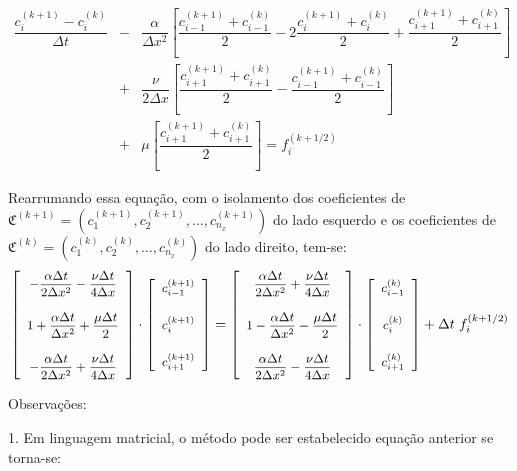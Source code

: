 \begin{eqnarray}
\dfrac{c_{i}^{(k+1)} - c_{i}^{(k)}}{\Delta t}
&-&
\dfrac{\alpha}{\Delta x^2}
\left[
\dfrac{c_{i-1}^{(k+1)}+c_{i-1}^{(k)}}{2}
-2
\dfrac{c_{i}^{(k+1)}+c_{i}^{(k)}}{2}
+
\dfrac{c_{i+1}^{(k+1)}+c_{i+1}^{(k)}}{2}
\right]
\nonumber \\
&+&
\dfrac{\nu}{2\Delta x}
\left[
\dfrac{c_{i+1}^{(k+1)}+c_{i+1}^{(k)}}{2}
-
\dfrac{c_{i-1}^{(k+1)}+c_{i-1}^{(k)}}{2}
\right]
\nonumber \\
&+&
\mu
\left[
\dfrac{c_{i+1}^{(k+1)}+c_{i+1}^{(k)}}{2}
\right]
= f_{i}^{(k+1/2)}
\label{eq:crank03}
\end{eqnarray}

Rearrumando essa equação, com o isolamento dos coeficientes de $\mathfrak{C}^{(k+1)} = \left(c_1^{(k+1)}, c_2^{(k+1)}, \ldots, c_{n_x}^{(k+1)}\right)$ do lado esquerdo e os coeficientes de $\mathfrak{C}^{(k)} = \left(c_1^{(k)}, c_2^{(k)}, \ldots, c_{n_x}^{(k)}\right)$ do lado direito, tem-se:
$$\small
\left[
\begin{array}{c}
- \dfrac{\alpha \Delta t}{2 \Delta x^2} - \dfrac{\nu\Delta t}{4\Delta x} \\[0.5cm]
1 + \dfrac{\alpha \Delta t}{\Delta x^2} + \dfrac{\mu \Delta t}{2} \\[0.5cm]
- \dfrac{\alpha \Delta t}{2 \Delta x^2} + \dfrac{\nu\Delta t}{4\Delta x}
\end{array}
\right]
\cdot
\left[
\begin{array}{c}
c_{i-1}^{(k+1)} \\[0.5cm]
c_{i}^{(k+1)} \\[0.5cm]
c_{i+1}^{(k+1)}
\end{array}
\right]
=
\left[
\begin{array}{c}
\dfrac{\alpha \Delta t}{2 \Delta x^2} + \dfrac{\nu\Delta t}{4\Delta x} \\[0.5cm]
1 - \dfrac{\alpha \Delta t}{\Delta x^2} - \dfrac{\mu \Delta t}{2} \\[0.5cm]
\dfrac{\alpha \Delta t}{2 \Delta x^2} - \dfrac{\nu\Delta t}{4\Delta x}
\end{array}
\right]
\cdot
\left[
\begin{array}{c}
c_{i-1}^{(k)} \\[0.5cm]
c_{i}^{(k)} \\[0.5cm]
c_{i+1}^{(k)}
\end{array}
\right]
+ \Delta t\ f_i^{(k+1/2)}
$$

Observações:

1. Em linguagem matricial, o método pode ser estabelecido equação anterior se torna-se:

